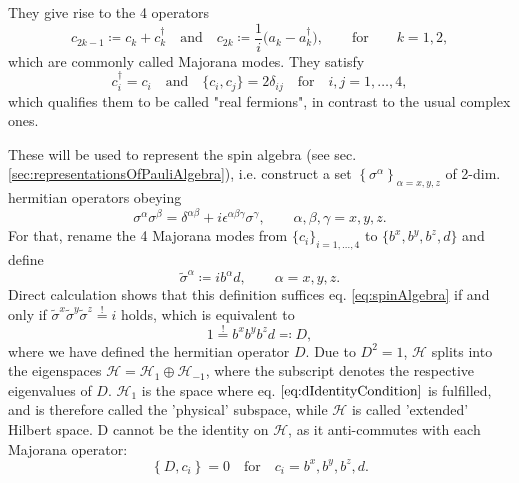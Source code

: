 \documentclass[%
fontsize=12pt, %
twoside=off %
]{scrbook}
\newcommand{\hilbert}{\mathcal{H}}
\newcommand{\for}{\quad\text{for}\quad}
\begin{document}
They give rise to the 4 operators
\begin{equation}
	c_{2k-1} \coloneq c_k + c_k^\dagger\quad\text{and}\quad c_{2k} \coloneq \frac{1}{i} \Big(a_k - a_k^\dagger\Big), \qquad\text{for}\qquad k=1,2,
	\label{eq:majoranasFromFermions}
\end{equation}
which are commonly called Majorana modes. They satisfy
\begin{equation}
	c_i^\dagger=c_i\quad\text{and}\quad\big\{c_i,c_j\big\}=2\delta_{ij} \for i,j=1,\dots,4,
	\label{eq:majoranaAntiCommutation}
\end{equation}
which qualifies them to be called "real fermions", in contrast to the usual complex ones.

These will be used to represent the spin algebra (see sec. \ref{sec:representationsOfPauliAlgebra}), i.e. construct a set $\left\{\sigma^\alpha\right\}_{\alpha=x,y,z}$ of 2-dim. hermitian operators obeying 
\begin{equation}
	\sigma^\alpha \sigma^\beta
	= \delta^{\alpha\beta}
	+ i\epsilon^{\alpha\beta\gamma}\sigma^\gamma,
	\qquad \alpha,\beta,\gamma=x,y,z.
	\label{eq:spinAlgebra}
\end{equation}
For that, rename the 4 Majorana modes from $\{c_i\}_{i=1,\dots,4}$ to $\{b^x,b^y,b^z,d\}$ and define
\begin{equation}
	\tilde\sigma^\alpha \coloneq i b^\alpha d,\qquad\alpha=x,y,z.
	\label{eq:spinFromMajoranasDef}
\end{equation}
Direct calculation shows that this definition suffices eq. \ref{eq:spinAlgebra} if and only if $\tilde\sigma^x\tilde\sigma^y\tilde\sigma^z\stackrel{!}{=}i$ holds, which is equivalent to
\begin{equation}
	1 \stackrel{!}{=} b^x b^y b^z d \eqcolon D,
	\label{eq:dIdentityCondition}
\end{equation}
where we have defined the hermitian operator $D$. Due to $D^2 = 1$, $\mathcal{H}$ splits into the eigenspaces $\mathcal{H} = \mathcal{H}_1 \oplus \mathcal{H}_{-1}$, 
where the subscript denotes the respective eigenvalues of $D$.  $\mathcal{H}_1$ is the space where eq. $\ref{eq:dIdentityCondition}$ is fulfilled, and is therefore called the 'physical' subspace, while $\hilbert$ is called 'extended' Hilbert space. D cannot be the identity on $\mathcal{H}$, as it anti-commutes with each Majorana operator:
\begin{equation}
	\left\{D,c_i\right\} = 0\quad\text{for}\quad c_i = b^x,b^y,b^z,d.
	\label{eq:dAntiCommutesWithMajoranas}
\end{equation}
\end{document}
